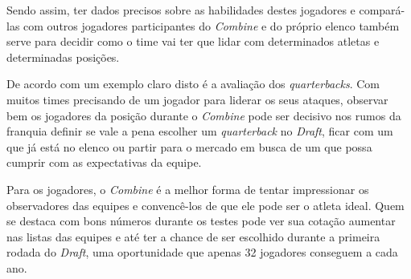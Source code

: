 Sendo assim, ter dados precisos sobre as habilidades destes jogadores e compará-las com outros jogadores participantes do \textit{Combine} e do próprio elenco também serve para decidir como o time vai ter que lidar com determinados atletas e determinadas posições.

De acordo com  um exemplo claro disto é a avaliação dos \textit{quarterbacks}. Com muitos times precisando de um jogador para liderar os seus ataques, observar bem os jogadores da posição durante o \textit{Combine} pode ser decisivo nos rumos da franquia definir se vale a pena escolher um \textit{quarterback} no \textit{Draft}, ficar com um que já está no elenco ou partir para o mercado em busca de um que possa cumprir com as expectativas da equipe.

Para os jogadores, o \textit{Combine} é a melhor forma de tentar impressionar os observadores das equipes e convencê-los de que ele pode ser o atleta ideal. Quem se destaca com bons números durante os testes pode ver sua cotação aumentar nas listas das equipes e até ter a chance de ser escolhido durante a primeira rodada do \textit{Draft}, uma oportunidade que apenas 32 jogadores conseguem a cada ano.



